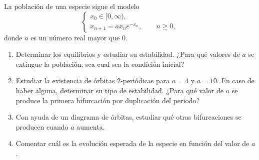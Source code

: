 \documentclass[11pt]{report}
\begin{document}
\begin{exercise}
    La población de una especie sigue el modelo
    \[\begin{cases}
        x_0 \in [0,\infty), \\
        x_{n+1} = ax_ne^{-x_n}, \qquad n \geq 0,
    \end{cases}\]
    donde $a$ es un número real mayor que $0$.
    \begin{enumerate}
        \item Determinar los equilibrios y estudiar su estabilidad. ¿Para qué valores de $a$ se extingue la población, sea cual sea la condición inicial?
        \item Estudiar la existencia de órbitas $2$-periódicas para $a = 4$ y $a = 10$. En caso de haber alguna, determinar su tipo de estabilidad. ¿Para qué valor de $a$ se produce la primera bifurcación por duplicación del periodo?
        \item Con ayuda de un diagrama de órbitas, estudiar qué otras bifurcaciones se producen cuando $a$ aumenta.
        \item Comentar cuál es la evolución esperada de la especie en función del valor de $a$.
    \end{enumerate}
\end{exercise}
\end{document}
